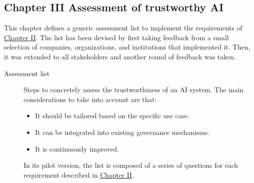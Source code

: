




\subsection{Chapter III Assessment of trustworthy AI} \label{sec:hleg_ch3}

This chapter defines a generic assessment list to implement the requirements of \hyperref[sec:hleg_ch2]{Chapter II}. The list has been devised by first taking feedback from a small selection of companies, organizations, and institutions that implemented it. Then, it was extended to all stakeholders and another round of feedback was taken.

\begin{description}
    \item[Assessment list] 
        Steps to concretely assess the trustworthiness of an AI system. The main considerations to take into account are that:
        \begin{itemize}
            \item It should be tailored based on the specific use case.
            \item It can be integrated into existing governance mechanisms.
            \item It is continuously improved.
        \end{itemize}

        \begin{remark}
            In its pilot version, the list is composed of a series of questions for each requirement described in \hyperref[sec:hleg_ch2]{Chapter II}.
        \end{remark}
\end{description}


